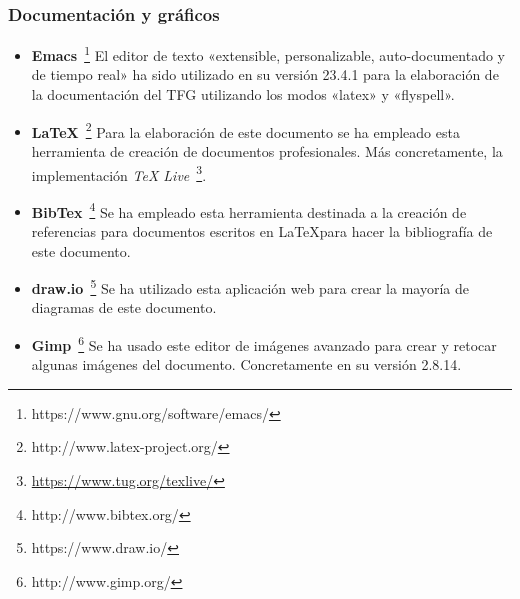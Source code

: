 \subsubsection{Documentación y gráficos}

\begin{itemize}
  \item \textbf{Emacs}~\footnote{https://www.gnu.org/software/emacs/} El editor de texto
    «extensible, personalizable, auto-documentado y de tiempo real» ha sido utilizado en su versión
    23.4.1 para la elaboración de la documentación del \acs{TFG} utilizando los modos «latex» y
    «flyspell».

  \item \textbf{\LaTeX}~\footnote{http://www.latex-project.org/} Para la elaboración de este
    documento se ha empleado esta herramienta de creación de documentos profesionales. Más
    concretamente, la implementación \textit{TeX
      Live}~\footnote{\url{https://www.tug.org/texlive/}}.

  \item \textbf{BibTex}~\footnote{http://www.bibtex.org/} Se ha empleado esta herramienta destinada
    a la creación de referencias para documentos escritos en \LaTeX para hacer la bibliografía de
    este documento.

  \item \textbf{draw.io}~\footnote{https://www.draw.io/} Se ha utilizado esta aplicación web para
    crear la mayoría de diagramas de este documento.

  \item \textbf{Gimp}~\footnote{http://www.gimp.org/} Se ha usado este editor de imágenes avanzado
    para crear y retocar algunas imágenes del documento. Concretamente en su versión 2.8.14.

\end{itemize}

